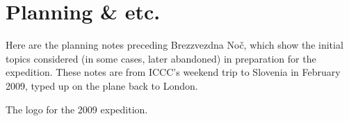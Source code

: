 \section{Planning \& etc.}

Here are the planning notes preceding Brezzvezdna Noč, which show the initial topics considered (in some cases, later abandoned) in preparation for the expedition. These notes are from ICCC's weekend trip to Slovenia in February 2009, typed up on the plane back to London.

\begin{marginfigure}
\checkoddpage \ifoddpage \forcerectofloat \else \forceversofloat \fi
\centering
 \caption{The logo for the 2009 expedition. }
 \label{expologo 2009}
\end{marginfigure}

